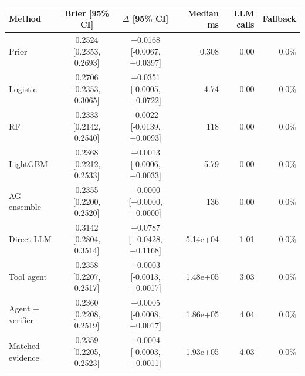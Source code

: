 \begin{tabular}{lccrrr}
\toprule
Method & Brier [95\% CI] & $\Delta$ [95\% CI] & Median ms & LLM calls & Fallback \\
\midrule
Prior & 0.2524 [0.2353, 0.2693] & +0.0168 [-0.0067, +0.0397] & 0.308 & 0.00 & 0.0\% \\
Logistic & 0.2706 [0.2353, 0.3065] & +0.0351 [-0.0005, +0.0722] & 4.74 & 0.00 & 0.0\% \\
RF & 0.2333 [0.2142, 0.2540] & -0.0022 [-0.0139, +0.0093] & 118 & 0.00 & 0.0\% \\
LightGBM & 0.2368 [0.2212, 0.2533] & +0.0013 [-0.0006, +0.0033] & 5.79 & 0.00 & 0.0\% \\
AG ensemble & 0.2355 [0.2200, 0.2520] & +0.0000 [+0.0000, +0.0000] & 136 & 0.00 & 0.0\% \\
Direct LLM & 0.3142 [0.2804, 0.3514] & +0.0787 [+0.0428, +0.1168] & 5.14e+04 & 1.01 & 0.0\% \\
Tool agent & 0.2358 [0.2207, 0.2517] & +0.0003 [-0.0013, +0.0017] & 1.48e+05 & 3.03 & 0.0\% \\
Agent + verifier & 0.2360 [0.2208, 0.2519] & +0.0005 [-0.0008, +0.0017] & 1.86e+05 & 4.04 & 0.0\% \\
Matched evidence & 0.2359 [0.2205, 0.2523] & +0.0004 [-0.0003, +0.0011] & 1.93e+05 & 4.03 & 0.0\% \\
\bottomrule
\end{tabular}

